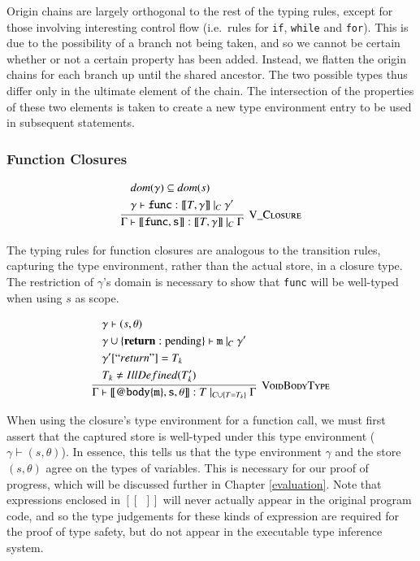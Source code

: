 \documentclass[12pt,a4paper,twoside,openright]{report}
\theoremstyle{definition}
\theoremstyle{dotless}
\newcommand*{\js}{\texttt}
\begin{document}
Origin chains are largely orthogonal to the rest of the typing rules, except
for those involving interesting control flow (i.e.~rules for \js{if},
\js{while} and \js{for}). This is due to the possibility of a branch not being
taken, and so we cannot be certain whether or not a certain property has been
added. Instead, we flatten the origin chains for each branch up until the
shared ancestor.  The two possible types thus differ only in the ultimate
element of the chain. The intersection of the properties of these two elements
is taken to create a new type environment entry to be used in subsequent
statements.

\subsubsection*{Function Closures}
$$
\infer[\textsc{V\_Closure}]{
  \Gamma\vdash\mathtt{[\![func, s]\!]}: [\![T, \gamma]\!]\ |_C\ \Gamma
}{
  \begin{split}
	&dom(\gamma) \subseteq dom(s) \\
	&\gamma \vdash \mathtt{func} : [\![T, \gamma]\!]\ |_C\ \gamma'
  \end{split}
}$$

The typing rules for function closures are analogous to the transition rules,
capturing the type environment, rather than the actual store, in a closure
type. The restriction of $\gamma$'s domain is necessary to show that \js{func} will be 
well-typed when using $s$ as scope.

$$\infer[\textsc{VoidBodyType}]{
  \Gamma\vdash\mathtt{[\![@body\{m\},s,\theta]\!]}:T\ |_{C\cup\{T=T_k\}}\ \Gamma
}{
  \begin{split}
	&\gamma \vdash (s, \theta) \\
	&\gamma\cup\{\mathbf{return}:\textrm{pending}\} \vdash \mathtt{m}\ |_C\ \gamma' \\
	&\gamma'[``return"] = T_k\\
	&T_k \neq IllDefined(T_k')
  \end{split}
}$$

When using the closure's type environment for a function call, we must first
assert that the captured store is well-typed under this type environment
($\gamma \vdash (s, \theta)$). In essence, this tells us that the type
environment $\gamma$ and the store $(s, \theta)$ agree on the types of
variables. This is necessary for our proof of progress, which will be discussed
further in Chapter \ref{evaluation}. Note that expressions enclosed in 
$\mathtt{[\![\ \ ]\!]}$ will never actually appear in the
original program code, and so the type judgements for these kinds of expression
are required for the proof of type safety, but do not appear in the executable
type inference system.
\end{document}
